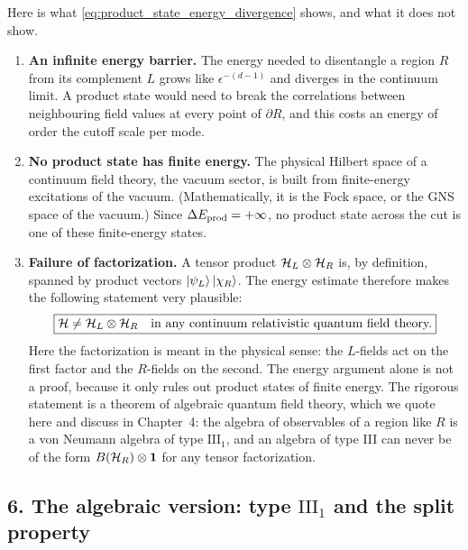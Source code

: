 Here is what \eqref{eq:product_state_energy_divergence} shows, and what it does not show.
\begin{enumerate}
\item \textbf{An infinite energy barrier.} The energy needed to disentangle a region $R$ from its
complement $L$ grows like $\epsilon^{-(d-1)}$ and diverges in the continuum limit. A product state would need
to break the correlations between neighbouring field values at every point of $\partial R$, and this costs an
energy of order the cutoff scale per mode.
\item \textbf{No product state has finite energy.} The physical Hilbert space of a continuum field theory, the
vacuum sector, is built from finite-energy excitations of the vacuum. (Mathematically, it is the Fock space,
or the GNS space of the vacuum.) Since $\Delta E_{\rm prod} = +\infty$, no product state across the cut is
one of these finite-energy states.
\item \textbf{Failure of factorization.} A tensor product $\mathcal{H}_L \otimes \mathcal{H}_R$ is, by definition, spanned by
product vectors $\ket{\psi_L}\ket{\chi_R}$. The energy estimate therefore makes the following statement
very plausible:
\begin{equation}
\boxed{\mathcal{H} \ne \mathcal{H}_L \otimes \mathcal{H}_R \quad \text{in any continuum relativistic quantum field theory.}}
\label{eq:non_factorization_conclusion}
\end{equation}
Here the factorization is meant in the physical sense: the $L$-fields act on the first factor and the
$R$-fields on the second. The energy argument alone is not a proof, because it only rules out product states
of finite energy. The rigorous statement is a theorem of algebraic quantum field theory, which we quote here
and discuss in Chapter~4: the algebra of observables of a region like $R$ is a von Neumann algebra of type
$\mathrm{III}_1$, and an algebra of type III can never be of the form $B(\mathcal{H}_R)\otimes\mathbf{1}$ for any tensor
factorization.
\end{enumerate}

\subsection*{6. The algebraic version: type $\mathrm{III}_1$ and the split property}

